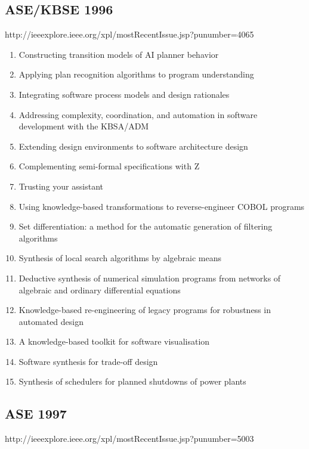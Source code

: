 \subsection{ASE/KBSE 1996}

http://ieeexplore.ieee.org/xpl/mostRecentIssue.jsp?punumber=4065

\begin{enumerate}[itemsep=-1ex]
  \item Constructing transition models of AI planner behavior
  \item Applying plan recognition algorithms to program understanding
  \item Integrating software process models and design rationales
  \item Addressing complexity, coordination, and automation in software development with the KBSA/ADM
  \item Extending design environments to software architecture design
  \item Complementing semi-formal specifications with Z
  \item Trusting your assistant
  \item Using knowledge-based transformations to reverse-engineer COBOL programs
  \item Set differentiation: a method for the automatic generation of filtering algorithms
  \item Synthesis of local search algorithms by algebraic means
  \item Deductive synthesis of numerical simulation programs from networks of algebraic and ordinary differential equations
  \item Knowledge-based re-engineering of legacy programs for robustness in automated design
  \item A knowledge-based toolkit for software visualisation
  \item Software synthesis for trade-off design
  \item Synthesis of schedulers for planned shutdowns of power plants 
\end{enumerate}

\subsection{ASE 1997}

http://ieeexplore.ieee.org/xpl/mostRecentIssue.jsp?punumber=5003

